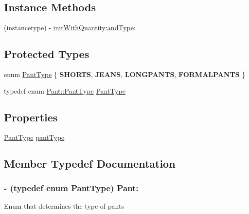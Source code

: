 \subsection*{Instance Methods}
\begin{DoxyCompactItemize}
\item 
(instancetype) -\/ \hyperlink{interface_pant_a1be7bfb6c6838da210d39538f273ea00}{init\-With\-Quantity\-:and\-Type\-:}
\end{DoxyCompactItemize}
\subsection*{Protected Types}
\begin{DoxyCompactItemize}
\item 
enum \hyperlink{interface_pant_a6b3d261fc9bd1f1502f11926fb34fc3c}{Pant\-Type} \{ {\bfseries S\-H\-O\-R\-T\-S}, 
{\bfseries J\-E\-A\-N\-S}, 
{\bfseries L\-O\-N\-G\-P\-A\-N\-T\-S}, 
{\bfseries F\-O\-R\-M\-A\-L\-P\-A\-N\-T\-S}
 \}
\item 
typedef enum \hyperlink{interface_pant_a6b3d261fc9bd1f1502f11926fb34fc3c}{Pant\-::\-Pant\-Type} \hyperlink{interface_pant_aae29dca1b56ea6999dcab09c51db0442}{Pant\-Type}
\end{DoxyCompactItemize}
\subsection*{Properties}
\begin{DoxyCompactItemize}
\item 
\hyperlink{interface_pant_a6b3d261fc9bd1f1502f11926fb34fc3c}{Pant\-Type} \hyperlink{interface_pant_a381c3b3606c1c88b2606945e382509fc}{pant\-Type}
\end{DoxyCompactItemize}


\subsection{Member Typedef Documentation}
\hypertarget{interface_pant_aae29dca1b56ea6999dcab09c51db0442}{
\subsubsection[{Pant\-Type}]{\setlength{\rightskip}{0pt plus 5cm}-\/ (typedef enum {\bf Pant\-Type})  Pant\-:\hspace{0.3cm}{\ttfamily [protected]}}}\label{interface_pant_aae29dca1b56ea6999dcab09c51db0442}
Enum that determines the type of pants 

